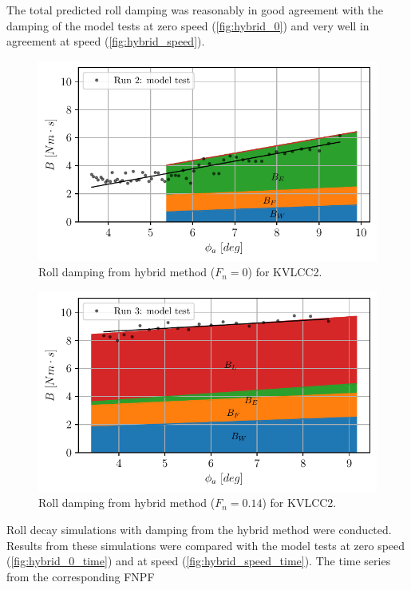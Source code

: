 The total predicted roll damping was reasonably in good agreement with the damping of the model tests at zero speed (\autoref{fig:hybrid_0}) and very well in agreement at speed (\autoref{fig:hybrid_speed}).
\begin{figure}[h]
\begin{center}\includegraphics[width=\textwidth]{figures/hybrid_0.pdf}\end{center}
\caption{Roll damping from hybrid method ($F_n = 0$) for KVLCC2.}
\label{fig:hybrid_0}
\end{figure}
\begin{figure}[h]
\begin{center}\includegraphics[width=\textwidth]{figures/hybrid_speed.pdf}\end{center}
\caption{Roll damping from hybrid method ($F_n = 0.14$) for KVLCC2.}
\label{fig:hybrid_speed}
\end{figure}
Roll decay simulations with damping from the hybrid method were conducted. Results from these simulations were compared with the model tests at zero speed (\autoref{fig:hybrid_0_time}) and at speed (\autoref{fig:hybrid_speed_time}). The time series from the corresponding FNPF

